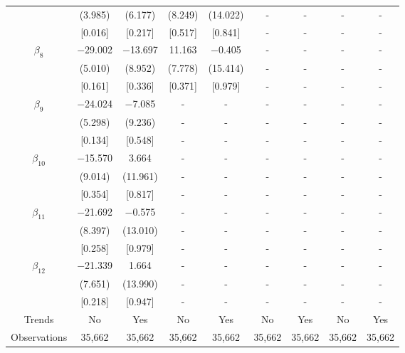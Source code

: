 \documentclass[12pt]{article}
\begin{document}
\begin{table}[h!]
\begin{adjustbox}{max width=\textwidth, scale=0.8}
\begin{tabular}{ccccccccc}
& (3.985) & (6.177) & (8.249) & (14.022) & - & - & - & - \\
& [0.016] & [0.217] & [0.517] & [0.841] & - & - & - & - \\
$\beta_{8}$ & $-$29.002 & $-$13.697 & 11.163 & $-$0.405 & - & - & - & - \\
& (5.010) & (8.952) & (7.778) & (15.414) & - & - & - & - \\
& [0.161] & [0.336] & [0.371] & [0.979] & - & - & - & - \\
$\beta_{9}$ & $-$24.024 & $-$7.085 & - & - & - & - & - & - \\
& (5.298) & (9.236) & - & - & - & - & - & - \\
& [0.134] & [0.548] & - & - & - & - & - & - \\
$\beta_{10}$ & $-$15.570 & 3.664 & - & - & - & - & - & - \\
& (9.014) & (11.961) & - & - & - & - & - & - \\
& [0.354] & [0.817] & - & - & - & - & - & - \\
$\beta_{11}$ & $-$21.692 & $-$0.575 & - & - & - & - & - & - \\
& (8.397) & (13.010) & - & - & - & - & - & - \\
& [0.258] & [0.979] & - & - & - & - & - & - \\
$\beta_{12}$ & $-$21.339 & 1.664 & - & - & - & - & - & - \\
& (7.651) & (13.990) & - & - & - & - & - & - \\
& [0.218] & [0.947] & - & - & - & - & - & - \\
\midrule
Trends & No & Yes & No & Yes & No & Yes & No & Yes \\
Observations & 35,662 & 35,662 & 35,662 & 35,662 & 35,662 & 35,662 & 35,662 & 35,662 \\
\bottomrule
\end{tabular}
\end{adjustbox}
\end{table}
\end{document}
